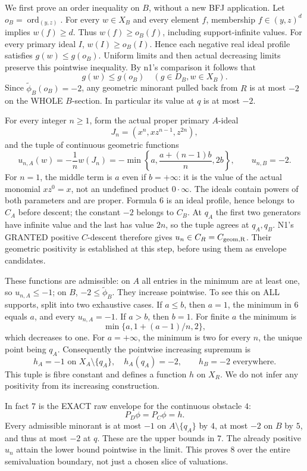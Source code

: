 \documentclass[11pt]{article}
\begin{document}
We first prove an order inequality on \(B\), without a new BFJ application. Let \(o_B=\operatorname{ord}_{(y,z)}\). For every \(w\in X_B\) and every element \(f\), membership \(f\in(y,z)^d\) implies \(w(f)\ge d\). Thus \(w(f)\ge o_B(f)\), including support-infinite values. For every primary ideal \(I\), \(w(I)\ge o_B(I)\). Hence each negative real ideal profile satisfies \(g(w)\le g(o_B)\). Uniform limits and then actual decreasing limits preserve this pointwise inequality. By n1's comparison it follows that
\[
g(w)\le g(o_B)\quad(g\in D_B, w\in X_B). \tag{5}
\]
Since \(\widetilde\phi_B(o_B)=-2\), any geometric minorant pulled back from \(R\) is at most \(-2\) on the WHOLE \(B\)-section. In particular its value at \(q\) is at most \(-2\).

For every integer \(n\ge1\), form the actual proper primary \(A\)-ideal
\[
J_n=(x^n,xz^{n-1},z^{2n}),
\]
and the tuple of continuous geometric functions
\[
u_{n,A}(w)=-\frac1n w(J_n)
=-\min\left\{a,\frac{a+(n-1)b}{n},2b\right\},
\qquad u_{n,B}=-2. \tag{6}
\]
For \(n=1\), the middle term is \(a\) even if \(b=+\infty\): it is the value of the actual monomial \(xz^0=x\), not an undefined product \(0\cdot\infty\). The ideals contain powers of both parameters and are proper. Formula \(6\) is an ideal profile, hence belongs to \(C_A\) before descent; the constant \(-2\) belongs to \(C_B\). At \(q_A\) the first two generators have infinite value and the last has value \(2n\), so the tuple agrees at \(q_A,q_B\). N1's GRANTED positive \(C\)-descent therefore gives \(u_n\in C_R=C_{\rm geom,R}\). Their geometric positivity is established at this step, before using them as envelope candidates.

These functions are admissible: on \(A\) all entries in the minimum are at least one, so \(u_{n,A}\le-1\); on \(B\), \(-2\le\widetilde\phi_B\). They increase pointwise. To see this on ALL supports, split into two exhaustive cases. If \(a\le b\), then \(a=1\), the minimum in \(6\) equals \(a\), and every \(u_{n,A}=-1\). If \(a>b\), then \(b=1\). For finite \(a\) the minimum is
\[
\min\{a,1+(a-1)/n,2\},
\]
which decreases to one. For \(a=+\infty\), the minimum is two for every \(n\), the unique point being \(q_A\). Consequently the pointwise increasing supremum is
\[
h_A=-1\text{ on }X_A\setminus\{q_A\},\quad h_A(q_A)=-2,
\qquad h_B=-2\text{ everywhere}. \tag{7}
\]
This tuple is fibre constant and defines a function \(h\) on \(X_R\). We do not infer any positivity from its increasing construction.

In fact \(7\) is the EXACT raw envelope for the continuous obstacle \(4\):
\[
P_D\phi=P_C\phi=h. \tag{8}
\]
Every admissible minorant is at most \(-1\) on \(A\setminus\{q_A\}\) by \(4\), at most \(-2\) on \(B\) by \(5\), and thus at most \(-2\) at \(q\). These are the upper bounds in \(7\). The already positive \(u_n\) attain the lower bound pointwise in the limit. This proves \(8\) over the entire semivaluation boundary, not just a chosen slice of valuations.
\end{document}
